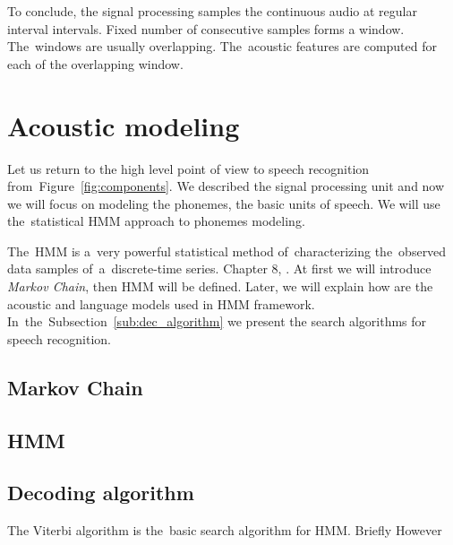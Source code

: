 To conclude, the signal processing samples the continuous audio at regular interval intervals. 
Fixed number of consecutive samples forms a window. The~windows are usually overlapping.
The~acoustic features are computed for each of the overlapping window. 

\section{Acoustic modeling}
\label{sub:decoding_with_hmm}
Let us return to the high level point of view to speech recognition from~Figure~\ref{fig:components}.
We described the signal processing unit and now we will focus on modeling the phonemes, the basic
units of speech. We will use the~statistical \ac{HMM} approach to phonemes modeling.

The~\ac{HMM} is a~very powerful statistical method of~characterizing the~observed data samples 
of~a~discrete-time series. Chapter 8, \cite{huang2001spoken}.
At first we will introduce {\it Markov Chain}, then \ac{HMM} will be defined. Later,  we will explain 
how are the acoustic and language models used in \ac{HMM} framework. 
In~the~Subsection~\ref{sub:dec_algorithm} we present the search algorithms for speech recognition.


\subsection*{Markov Chain}
\label{ssub:markov_chain}

\subsection{\acl{HMM}}
\label{ssub:hmm}






\subsection*{Decoding algorithm}
\label{sub:dec_algorithm}
The Viterbi algorithm is the~basic search algorithm for \ac{HMM}. 
Briefly
However

